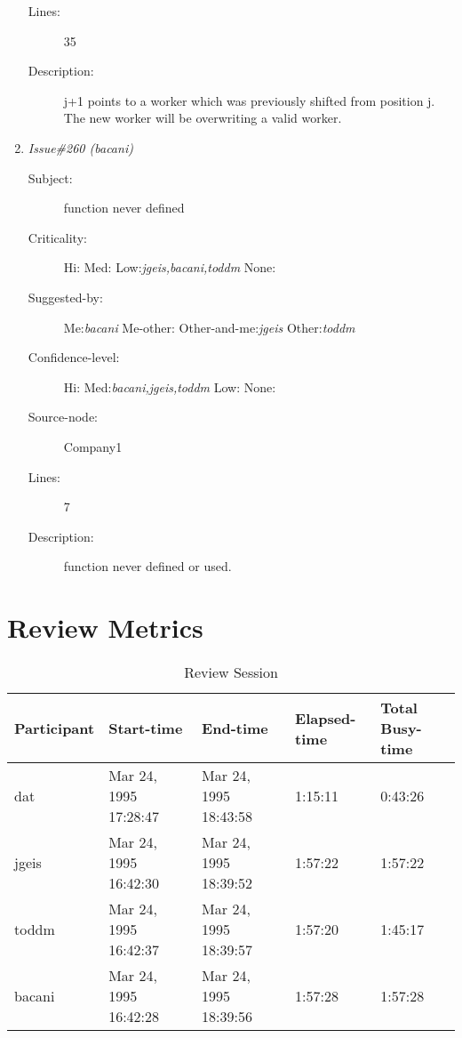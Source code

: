 \begin{enumerate}
\begin{description}
\item [Lines:] 35

\item [Description:] j+1 points to a worker which was previously
shifted from position j. The new worker will be overwriting a valid worker.
\end{description}
\item {\it Issue\#260 (bacani)}
\begin{description}
\item [Subject:] function never defined
\item [Criticality:] Hi:{\it } Med:{\it } Low:{\it jgeis,bacani,toddm} None:{\it }
\item [Suggested-by:] Me:{\it bacani} Me-other:{\it } Other-and-me:{\it jgeis} Other:{\it toddm}
\item [Confidence-level:] Hi:{\it } Med:{\it bacani,jgeis,toddm} Low:{\it } None:{\it }
\item [Source-node:] Company1

\item [Lines:] 7

\item [Description:] function never defined or used.
\end{description}
\end{enumerate}
\section{Review Metrics}
\begin{table}[hb]
\begin{center}
\begin{tabular}{|l|l|l|l|l|}
\hline
Participant & Start-time & End-time & Elapsed-time & Total Busy-time \\
\hline
dat & Mar 24, 1995 17:28:47 & Mar 24, 1995 18:43:58 & 1:15:11 & 0:43:26 \\
jgeis & Mar 24, 1995 16:42:30 & Mar 24, 1995 18:39:52 & 1:57:22 & 1:57:22 \\
toddm & Mar 24, 1995 16:42:37 & Mar 24, 1995 18:39:57 & 1:57:20 & 1:45:17 \\
bacani & Mar 24, 1995 16:42:28 & Mar 24, 1995 18:39:56 & 1:57:28 & 1:57:28 \\
\hline
\end{tabular}
\end{center}
\caption{Review Session}
\end{table}


